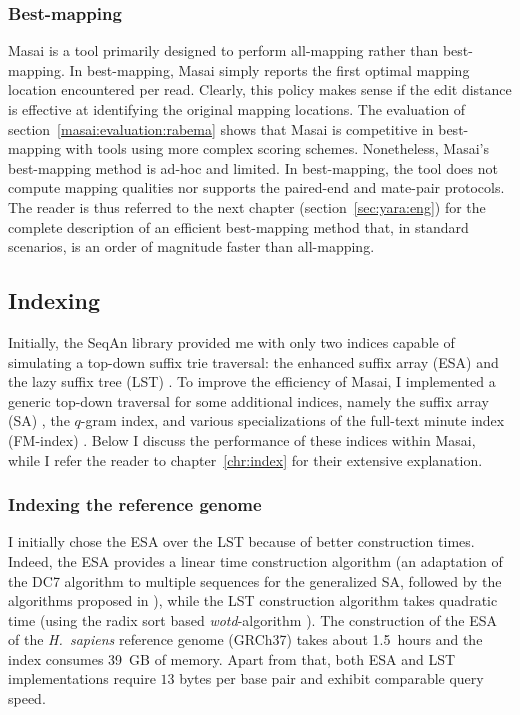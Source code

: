 \subsubsection{Best-mapping}

Masai is a tool primarily designed to perform all-mapping rather than best-mapping.
In best-mapping, Masai simply reports the first optimal mapping location encountered per read.
Clearly, this policy makes sense if the edit distance is effective at identifying the original mapping locations.
The evaluation of section~\ref{masai:evaluation:rabema} shows that Masai is competitive in best-mapping with tools using more complex scoring schemes.
Nonetheless, Masai's best-mapping method is ad-hoc and limited.
In best-mapping, the tool does not compute mapping qualities nor supports the paired-end and mate-pair protocols.
The reader is thus referred to the next chapter (section~\ref{sec:yara:eng}) for the complete description of an efficient best-mapping method that, in standard scenarios, is an order of magnitude faster than all-mapping.

\subsection{Indexing}
\label{masai:engineering:index}

Initially, the SeqAn library provided me with only two indices capable of simulating a top-down suffix trie traversal: the enhanced suffix array (ESA) \citep{Abouelhoda2004} and the lazy suffix tree (LST) \citep{Giegerich1999}.
To improve the efficiency of Masai, I implemented a generic top-down traversal for some additional indices, namely the suffix array (SA) \citep{Manber1990}, the $q$-gram index, and various specializations of the full-text minute index (FM-index) \citep{Ferragina2001}.
Below I discuss the performance of these indices within Masai, while I refer the reader to chapter~\ref{chr:index} for their extensive explanation.

\subsubsection{Indexing the reference genome}

I initially chose the ESA over the LST because of better construction times.
Indeed, the ESA provides a linear time construction algorithm (an adaptation of the DC7 algorithm \citep{Dementiev2008} to multiple sequences \citep{Weese2013} for the generalized SA, followed by the algorithms proposed in \citep{Kasai2001,Abouelhoda2004}), while the LST construction algorithm takes quadratic time (using the radix sort based \emph{wotd}-algorithm \citep{Giegerich1999}).
The construction of the ESA of the \emph{H.~sapiens} reference genome (GRCh37) takes about 1.5~hours and the index consumes 39~GB of memory.%
Apart from that, both ESA and LST implementations require $13$ bytes per base pair and exhibit comparable query speed.

